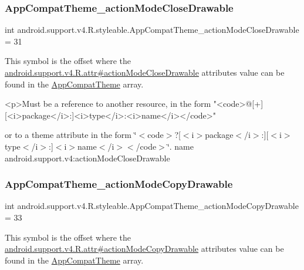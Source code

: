 \subsubsection{\texorpdfstring{App\+Compat\+Theme\+\_\+action\+Mode\+Close\+Drawable}{AppCompatTheme\_actionModeCloseDrawable}}
{\footnotesize\ttfamily int android.\+support.\+v4.\+R.\+styleable.\+App\+Compat\+Theme\+\_\+action\+Mode\+Close\+Drawable = 31\hspace{0.3cm}{\ttfamily [static]}}

This symbol is the offset where the \hyperlink{classandroid_1_1support_1_1v4_1_1R_1_1attr_ad3242ecccbfe30007483999e176047de}{android.\+support.\+v4.\+R.\+attr\#action\+Mode\+Close\+Drawable} attribute\textquotesingle{}s value can be found in the \hyperlink{classandroid_1_1support_1_1v4_1_1R_1_1styleable_ac07ebbe62ed977f6dcaadc6397840ace}{App\+Compat\+Theme} array.

\begin{DoxyVerb}      <p>Must be a reference to another resource, in the form "<code>@[+][<i>package</i>:]<i>type</i>:<i>name</i></code>"
\end{DoxyVerb}
 or to a theme attribute in the form \char`\"{}$<$code$>$?\mbox{[}$<$i$>$package$<$/i$>$\+:\mbox{]}\mbox{[}$<$i$>$type$<$/i$>$\+:\mbox{]}$<$i$>$name$<$/i$>$$<$/code$>$\char`\"{}.  name android.\+support.\+v4\+:action\+Mode\+Close\+Drawable \mbox{\label{classandroid_1_1support_1_1v4_1_1R_1_1styleable_a50471ef5cb2699d49ac3b144a6fbb0b4}} 
\subsubsection{\texorpdfstring{App\+Compat\+Theme\+\_\+action\+Mode\+Copy\+Drawable}{AppCompatTheme\_actionModeCopyDrawable}}
{\footnotesize\ttfamily int android.\+support.\+v4.\+R.\+styleable.\+App\+Compat\+Theme\+\_\+action\+Mode\+Copy\+Drawable = 33\hspace{0.3cm}{\ttfamily [static]}}

This symbol is the offset where the \hyperlink{classandroid_1_1support_1_1v4_1_1R_1_1attr_af82835da89e3dbfb288ee7fd390bcb60}{android.\+support.\+v4.\+R.\+attr\#action\+Mode\+Copy\+Drawable} attribute\textquotesingle{}s value can be found in the \hyperlink{classandroid_1_1support_1_1v4_1_1R_1_1styleable_ac07ebbe62ed977f6dcaadc6397840ace}{App\+Compat\+Theme} array.

